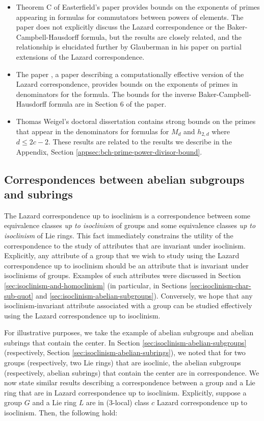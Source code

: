 \documentclass{ucetd}
\begin{document}
\begin{itemize}
\item Theorem C of Easterfield's paper \cite{Easterfield} provides
  bounds on the exponents of primes appearing in formulas for
  commutators between powers of elements. The paper does not
  explicitly discuss the Lazard correspondence or the
  Baker-Campbell-Hausdorff formula, but the results are closely
  related, and the relationship is elucidated further by Glauberman in
  his paper \cite{Partialextensions} on partial extensions of the
  Lazard correspondence.
\item The paper \cite{Lazardeffective}, a paper describing a
  computationally effective version of the Lazard correspondence,
  provides bounds on the exponents of primes in denominators for the
  formula. The bounds for the inverse Baker-Campbell-Hausdorff formula
  are in Section 6 of the paper.
\item Thomas Weigel's doctoral dissertation \cite{Weigel} contains
  strong bounds on the primes that appear in the denominators for
  formulas for $M_d$ and $h_{2,d}$ where $d \le 2c - 2$. These results
  are related to the results we describe in the Appendix, Section
  \ref{appsec:bch-prime-power-divisor-bound}.
\end{itemize}

\subsection{Correspondences between abelian subgroups and subrings}

The Lazard correspondence up to isoclinism is a correspondence between
some equivalence classes {\em up to isoclinism} of groups and some
equivalence classes {\em up to isoclinism} of Lie rings. This fact
immediately constrains the utility of the correspondence to the study
of attributes that are invariant under isoclinism. Explicitly, any
attribute of a group that we wish to study using the Lazard
correspondence up to isoclinism should be an attribute that is
invariant under isoclinisms of groups. Examples of such attributes
were discussed in Section \ref{sec:isoclinism-and-homoclinism} (in
particular, in Sections \ref{sec:isoclinism-char-sub-quot} and
\ref{sec:isoclinism-abelian-subgroups}). Conversely, we hope that any
isoclinism-invariant attribute associated with a group can be studied
effectively using the Lazard correspondence up to isoclinism.

For illustrative purposes, we take the example of abelian subgroups
and abelian subrings that contain the center. In Section
\ref{sec:isoclinism-abelian-subgroups} (respectively, Section
\ref{sec:isoclinism-abelian-subrings}), we noted that for two groups
(respectively, two Lie rings) that are isoclinic, the abelian
subgroups (respectively, abelian subrings) that contain the center are
in correspondence. We now state similar results describing a
correspondence between a group and a Lie ring that are in Lazard
correspondence up to isoclinism. Explicitly, suppose a group $G$ and a
Lie ring $L$ are in ($3$-local) class $c$ Lazard correspondence up to
isoclinism. Then, the following hold:
\end{document}
